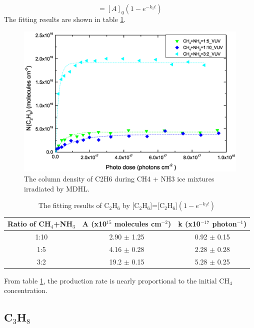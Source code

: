 \begin{equation}
[A] = [A]_0(1 - e^{-k_1 t})
\label{eq:1step}
\end{equation}
The fitting results are shown in table \ref{tab:fittingC2H6}.

\begin{figure}
\centering
\includegraphics[width=\textwidth]{figures/chapter3/Lab_C2H6.eps}
\caption{The column density of C2H6 during CH4 + NH3 ice mixtures irradiated by MDHL. }
\label{fig:lab_C2H6}
\end{figure}

\begin{table}[htbp]
\caption{The fitting results of C$_2$H$_6$ by [C$_2$H$_6$]=[C$_2$H$_6$]$(1 - e^{-k_1 t})$}
\label{tab:fittingC2H6}
\begin{tabular}{ccc}
\hline
\hline
Ratio of CH$_4$+NH$_3$ & A (x10$^{15}$ molecules cm$^{-2}$) & k (x10$^{-17}$ photon$^{-1}$) \\
\hline
1:10 & 2.90 $\pm$ 1.25 & 0.92 $\pm$ 0.15 \\
1:5 & 4.16 $\pm$ 0.28 & 2.28 $\pm$ 0.28 \\
3:2 & 19.2 $\pm$ 0.15 & 5.28 $\pm$ 0.25 \\
\hline
\end{tabular}
\end{table}

From table \ref{tab:fittingC2H6}, the production rate is nearly proportional to the initial CH$_4$ concentration.


\subsection{C$_3$H$_8$}

